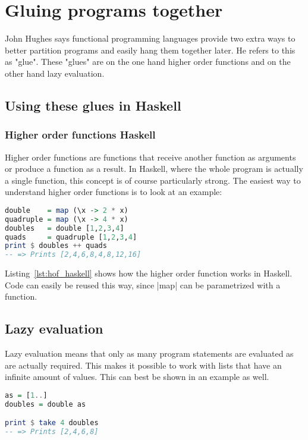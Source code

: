 \section{Gluing programs together}
John Hughes says functional programming languages provide two extra ways to
better partition programs and easily hang them together later. He refers to
this as "glue". These "glues" are on the one hand higher order functions and on
the other hand lazy evaluation. \cite{hughes_why_1989}

\subsection{Using these glues in Haskell} %
\label{sub:Using the glues in Haskel}
\subsubsection{Higher order functions Haskell} %
\label{sec:Higher order functions Haskell}
Higher order functions are functions that receive another function as arguments
or produce a function as a result. In Haskell, where the whole program is
actually a single function, this concept is of course particularly strong.
The easiest way to understand higher order functions is to look at an
example:
\begin{lstlisting}[language=Haskell, caption=Higher order functions in
HaskellHigher order functions in Haskell \label{lst:hof_haskell}]
double    = map (\x -> 2 * x)
quadruple = map (\x -> 4 * x)
doubles   = double [1,2,3,4]
quads     = quadruple [1,2,3,4]
print $ doubles ++ quads
-- => Prints [2,4,6,8,4,8,12,16]
\end{lstlisting}

Listing~\ref{lst:hof_haskell} shows how the higher order function 
works in Haskell. Code can easily be reused this way, since |map| can
be parametrized with a function.
\subsection{Lazy evaluation} %
\label{sub:Lazy evaluation}
Lazy evaluation means that only as many program statements are evaluated as are
actually required. This makes it possible to work with lists that have an
infinite amount of values. This can best be shown in an example as well.

\begin{lstlisting}[language=Haskell, caption=lazy evaluation in Haskell
  \label{lst:lazy_eval_haskell}]
as = [1..]
doubles = double as

print $ take 4 doubles 
-- => Prints [2,4,6,8]
\end{lstlisting}

